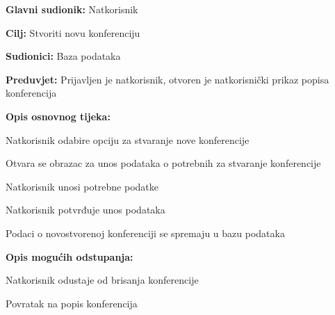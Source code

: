 					\noindent {}
					\begin{packed_item}
						
						\item \textbf{Glavni sudionik: } Natkorisnik
						\item  \textbf{Cilj:} Stvoriti novu konferenciju
						\item  \textbf{Sudionici:} Baza podataka
						\item  \textbf{Preduvjet:} Prijavljen je natkorisnik, otvoren je natkorisnički prikaz popisa konferencija
						\item  \textbf{Opis osnovnog tijeka:}
						
						\item[] \begin{packed_enum}
							
							\item Natkorisnik odabire opciju za stvaranje nove konferencije
							\item Otvara se obrazac za unos podataka o potrebnih za stvaranje konferencije
							\item Natkorisnik unosi potrebne podatke
							\item Natkorisnik potvrđuje unos podataka
							\item Podaci o novostvorenoj konferenciji se spremaju u bazu podataka
							
						\end{packed_enum}
						
						\item  \textbf{Opis mogućih odstupanja:}
						
						\item[] \begin{packed_item}
							
							\item[4.a] Natkorisnik odustaje od brisanja konferencije
							\item[] \begin{packed_enum}
								
								\item Povratak na popis konferencija
								
							\end{packed_enum}
						\end{packed_item}
					\end{packed_item}
					
